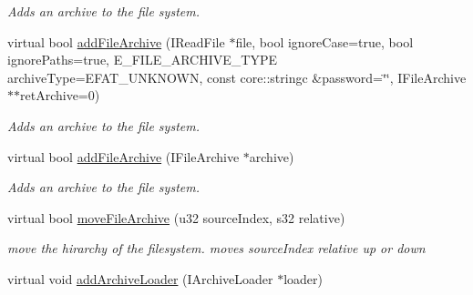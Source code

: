 \begin{DoxyCompactItemize}
\begin{DoxyCompactList}\small\item\em Adds an archive to the file system. \end{DoxyCompactList}\item 
\hypertarget{classirr_1_1io_1_1_c_file_system_adcba3f788f55199aeda2be7ff1a106b5}{virtual bool \hyperlink{classirr_1_1io_1_1_c_file_system_adcba3f788f55199aeda2be7ff1a106b5}{add\-File\-Archive} (I\-Read\-File $\ast$file, bool ignore\-Case=true, bool ignore\-Paths=true, E\-\_\-\-F\-I\-L\-E\-\_\-\-A\-R\-C\-H\-I\-V\-E\-\_\-\-T\-Y\-P\-E archive\-Type=E\-F\-A\-T\-\_\-\-U\-N\-K\-N\-O\-W\-N, const core\-::stringc \&password=\char`\"{}\char`\"{}, I\-File\-Archive $\ast$$\ast$ret\-Archive=0)}\label{classirr_1_1io_1_1_c_file_system_adcba3f788f55199aeda2be7ff1a106b5}

\begin{DoxyCompactList}\small\item\em Adds an archive to the file system. \end{DoxyCompactList}\item 
\hypertarget{classirr_1_1io_1_1_c_file_system_a1804a6df3af1217db08b7c5a13deb788}{virtual bool \hyperlink{classirr_1_1io_1_1_c_file_system_a1804a6df3af1217db08b7c5a13deb788}{add\-File\-Archive} (I\-File\-Archive $\ast$archive)}\label{classirr_1_1io_1_1_c_file_system_a1804a6df3af1217db08b7c5a13deb788}

\begin{DoxyCompactList}\small\item\em Adds an archive to the file system. \end{DoxyCompactList}\item 
\hypertarget{classirr_1_1io_1_1_c_file_system_a4912d9b72d602fe74f6a9c5c6388e492}{virtual bool \hyperlink{classirr_1_1io_1_1_c_file_system_a4912d9b72d602fe74f6a9c5c6388e492}{move\-File\-Archive} (u32 source\-Index, s32 relative)}\label{classirr_1_1io_1_1_c_file_system_a4912d9b72d602fe74f6a9c5c6388e492}

\begin{DoxyCompactList}\small\item\em move the hirarchy of the filesystem. moves source\-Index relative up or down \end{DoxyCompactList}\item 
\hypertarget{classirr_1_1io_1_1_c_file_system_a25c49d0917f6629ccac0e003a6658027}{virtual void \hyperlink{classirr_1_1io_1_1_c_file_system_a25c49d0917f6629ccac0e003a6658027}{add\-Archive\-Loader} (I\-Archive\-Loader $\ast$loader)}\label{classirr_1_1io_1_1_c_file_system_a25c49d0917f6629ccac0e003a6658027}


\end{DoxyCompactItemize}
